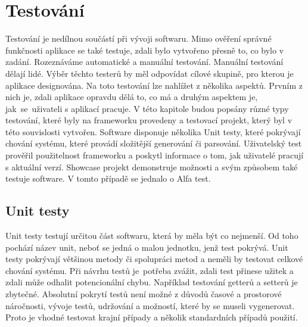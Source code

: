 \chapter{Testování}
Testování je nedílnou součástí při vývoji softwaru. Mimo ověření správné funkčnosti aplikace se také testuje, zdali bylo vytvořeno přesně to, co bylo v zadání. Rozeznáváme automatické a manuální testování. Manuální testování dělají lidé. Výběr těchto testerů by měl odpovídat cílové skupině, pro kterou je aplikace designována. Na toto testování lze nahlížet z několika aspektů. Prvním z nich je, zdali aplikace opravdu dělá to, co má a druhým aspektem je, jak~se~uživateli s aplikací pracuje. V této kapitole budou popsány různé typy testování, které byly na frameworku provedeny a testovací projekt, který byl v této souvislosti vytvořen. Software disponuje několika Unit testy, které pokrývají chování systému, které provádí složitější generování či parsování. Uživatelský test prověřil použitelnost frameworku a poskytl informace o tom, jak uživatelé pracují s aktuální verzí. Showcase projekt demonstruje možnosti a svým způsobem také testuje software. V tomto případě se jednalo o Alfa test.

\section{Unit testy}
Unit testy testují určitou část softwaru, která by měla být co nejmenší. Od toho pochází název unit, neboť se jedná o malou jednotku, jenž test pokrývá. Unit testy pokrývají většinou metody či spolupráci metod a neměli by testovat celkové chování systému. Při návrhu testů je~potřeba zvážit, zdali test přinese užitek a zdali může odhalit potencionální chybu. Například testování getterů a setterů je zbytečné. Absolutní pokrytí testů není možné z důvodů časové a prostorové náročnosti, vývoje testů, udržování a možností, které by se museli vygenerovat. Proto je vhodné testovat krajní případy a několik standardních případů použití. 

